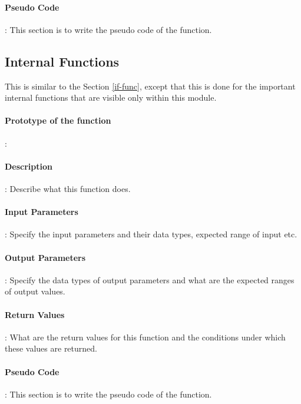\documentclass[a4paper,11pt]{article}
\begin{document}
\paragraph{Pseudo Code}: This section is to write the pseudo code of the function.

\subsection{Internal Functions}

This is similar to the Section \ref{if-func}, except that this is done for the important internal functions that are visible only within this module.

\paragraph{Prototype of the function}:

\paragraph{Description}: Describe what this function does.

\paragraph{Input Parameters}: Specify the input parameters and their data types, expected range of input etc.

\paragraph{Output Parameters}: Specify the data types of output parameters and what are the expected ranges of output values.

\paragraph{Return Values}: What are the return values for this function and the conditions under which these values are returned. 

\paragraph{Pseudo Code}: This section is to write the pseudo code of the function.
\end{document}
